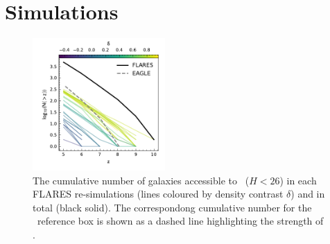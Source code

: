 

\section{Simulations}


\begin{figure}
	\centering
	\includegraphics[width=0.45\textwidth]{./figures/simulations/N}
	\caption{The cumulative number of galaxies accessible to \euclid\ ($H<26$) in each FLARES re-simulations (lines coloured by density contrast $\delta$) and in total (black solid). The correspondong cumulative number for the \eagle\ reference box is shown as a dashed line highlighting the strength of \flares. \label{fig:N}}
\end{figure}
